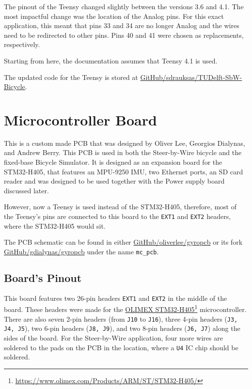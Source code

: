 The pinout of the Teensy changed slightly between the versions 3.6 and 4.1. The most impactful change was the location of the Analog pins. For this exact application, this meant that pins 33 and 34 are no longer Analog and the wires need to be redirected to other pins. Pins 40 and 41 were chosen as replacements, respectively.

Starting from here, the documentation assumes that Teensy 4.1 is used.

The updated code for the Teensy is stored at \href{https://github.com/sdrauksas/TUDelft-SbW-Bicycle}{GitHub/sdrauksas/TUDelft-SbW-Bicycle}.


\section{Microcontroller Board}
This is a custom made PCB that was designed by Oliver Lee, Georgios Dialynas, and Andrew Berry. This PCB is used in both the Steer-by-Wire bicycle and the fixed-base Bicycle Simulator. It is designed as an expansion board for the STM32-H405, that features an MPU-9250 IMU, two Ethernet ports, an SD card reader and was designed to be used together with the Power supply board discussed later.

However, now a Teensy is used instead of the STM32-H405, therefore, most of the Teensy's pins are connected to this board to the \verb|EXT1| and \verb|EXT2| headers, where the STM32-H405 would sit.

The PCB schematic can be found in either \href{https://github.com/oliverlee/gyropcb}{GitHub/oliverlee/gyropcb} or its fork \href{https://github.com/gdialynas/gyropcb}{GitHub/gdialynas/gyropcb} under the name \verb|mc_pcb|.

\subsection{Board's Pinout}
This board features two 26-pin headers \verb|EXT1| and \verb|EXT2| in the middle of the board. These headers were made for the \href{https://www.olimex.com/Products/ARM/ST/STM32-H405/}{OLIMEX STM32-H405}\footnote{\href{https://www.olimex.com/Products/ARM/ST/STM32-H405/}{https://www.olimex.com/Products/ARM/ST/STM32-H405/}} microcontroller. There are also seven 2-pin headers (from \verb|J10| to \verb|J16|), three 4-pin headers (\verb|J3, J4, J5|), two 6-pin headers (\verb|J8, J9|), and two 8-pin headers (\verb|J6, J7|) along the sides of the board. For the Steer-by-Wire application, four more wires are soldered to the pads on the PCB in the location, where a \verb|U4| IC chip should be soldered.

